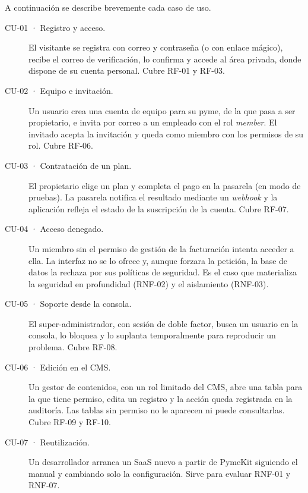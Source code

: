 
A continuación se describe brevemente cada caso de uso.

\begin{description}
  \item[CU-01 · Registro y acceso.] El visitante se registra con correo y
        contraseña (o con enlace mágico), recibe el correo de verificación,
        lo confirma y accede al área privada, donde dispone de su cuenta
        personal. Cubre RF-01 y RF-03.
  \item[CU-02 · Equipo e invitación.] Un usuario crea una cuenta de equipo
        para su pyme, de la que pasa a ser propietario, e invita por correo a
        un empleado con el rol \textit{member}. El invitado acepta la
        invitación y queda como miembro con los permisos de su rol. Cubre
        RF-06.
  \item[CU-03 · Contratación de un plan.] El propietario elige un plan y
        completa el pago en la pasarela (en modo de pruebas). La pasarela
        notifica el resultado mediante un \textit{webhook} y la aplicación
        refleja el estado de la suscripción de la cuenta. Cubre RF-07.
  \item[CU-04 · Acceso denegado.] Un miembro sin el permiso de gestión de la
        facturación intenta acceder a ella. La interfaz no se lo ofrece y,
        aunque forzara la petición, la base de datos la rechaza por sus
        políticas de seguridad. Es el caso que materializa la seguridad en
        profundidad (RNF-02) y el aislamiento (RNF-03).
  \item[CU-05 · Soporte desde la consola.] El super-administrador, con sesión
        de doble factor, busca un usuario en la consola, lo bloquea y lo
        suplanta temporalmente para reproducir un problema. Cubre RF-08.
  \item[CU-06 · Edición en el CMS.] Un gestor de contenidos, con un rol
        limitado del CMS, abre una tabla para la que tiene permiso, edita un
        registro y la acción queda registrada en la auditoría. Las tablas sin
        permiso no le aparecen ni puede consultarlas. Cubre RF-09 y RF-10.
  \item[CU-07 · Reutilización.] Un desarrollador arranca un SaaS nuevo a
        partir de PymeKit siguiendo el manual y cambiando solo la
        configuración. Sirve para evaluar RNF-01 y RNF-07.
\end{description}

